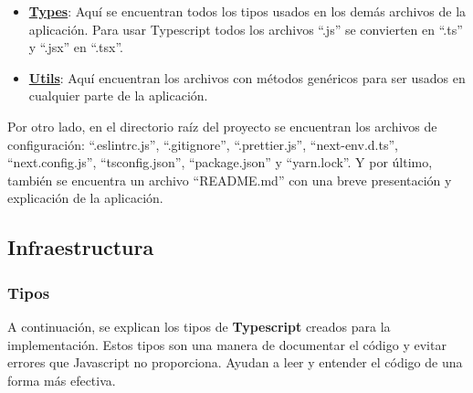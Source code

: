 \documentclass[12pt,twoside,titlepage]{report}
\begin{document}
\begin{itemize}
    \item \href{https://github.com/alberttogoca/EarFit/tree/main/src/types}{\textbf{Types}}: Aquí se encuentran todos los tipos usados en los demás archivos de la aplicación. Para usar Typescript todos los archivos ``.js'' se convierten en ``.ts'' y ``.jsx'' en ``.tsx''.
    \item \href{https://github.com/alberttogoca/EarFit/tree/main/src/utils}{\textbf{Utils}}: Aquí encuentran los archivos con métodos genéricos para ser usados en cualquier parte de la aplicación.
\end{itemize}

Por otro lado, en el directorio raíz del proyecto se encuentran los archivos de configuración: ``.eslintrc.js'', ``.gitignore'', ``.prettier.js'', ``next-env.d.ts'', ``next.config.js'', ``tsconfig.json'', ``package.json'' y ``yarn.lock''. 
Y por último, también se encuentra un archivo ``README.md'' con una breve presentación y explicación de la aplicación.

\subsection{Infraestructura}

\subsubsection{Tipos}
\label{sec:tipos}

A continuación, se explican los tipos de \textbf{Typescript} creados para la implementación. Estos tipos son una manera de documentar el código y evitar errores que Javascript no proporciona. Ayudan a leer y entender el código de una forma más efectiva.
\end{document}
